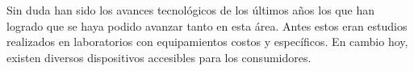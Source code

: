 Sin duda han sido los avances tecnológicos de los últimos años los que han logrado que se haya podido avanzar tanto en esta área. Antes estos eran estudios realizados en laboratorios con equipamientos costos y específicos. En cambio hoy, existen diversos dispositivos accesibles para los consumidores. 
